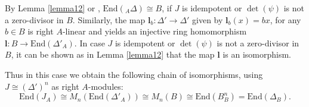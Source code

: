 \documentclass[oneside, a4paper, 11pt]{amsart}
\newcommand{\End}{\mathrm{End}}
\begin{document}
By Lemma \ref{lemma12} or \cite[Theorem 3.3]{CKLS},  $\End({_A\Delta}) \cong B$, if $J$ is idempotent or $\det(\psi)$ is not a zero-divisor in $B$. 
Similarly,  the map $\mathbf{l}_b:\Delta' \to \Delta'$ given by $\mathbf{l}_b(x)=bx$, for any $b\in B$ is  right $A$-linear and yields an injective ring homomorphism $\mathbf{l}:B\to \End({\Delta'_A})$. 
In case $J$ is idempotent or $\det(\psi)$ is not a zero-divisor in $B$, it can be shown as in Lemma \ref{lemma12} that the map $\mathbf{l}$ is an isomorphism.

Thus in this case we obtain the following chain of isomorphisms, using $J\cong (\Delta')^n$ as right $A$-modules:
\begin{equation}\label{eqn1}\End(J_A) \cong M_n(\End(\Delta'_A)) \cong  M_n(B) \cong \End(B^n_B) = \End(\Delta_B).\end{equation}
\end{document}
